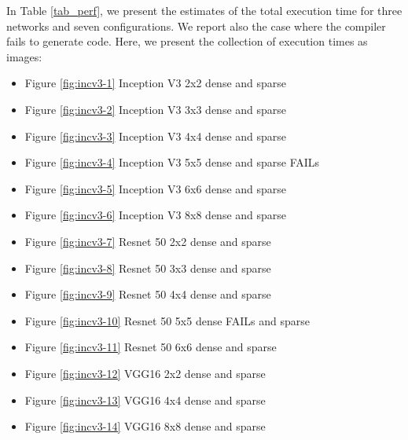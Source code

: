 \documentclass[conference]{IEEEtran}
\begin{document}
In Table \ref{tab_perf}, we present the estimates of the total
execution time for three networks and seven configurations. We report
also the case where the compiler fails to generate code.  Here, we
present the collection of execution times as images:
\begin{itemize}
  \item Figure \ref{fig:incv3-1} Inception V3 2x2 dense and sparse
  \item Figure \ref{fig:incv3-2} Inception V3 3x3 dense and sparse
  \item Figure \ref{fig:incv3-3} Inception V3 4x4 dense and sparse
  \item Figure \ref{fig:incv3-4} Inception V3 5x5 dense and sparse FAILs
  \item Figure \ref{fig:incv3-5} Inception V3 6x6 dense and sparse 
  \item Figure \ref{fig:incv3-6} Inception V3 8x8 dense and sparse
  \item Figure \ref{fig:incv3-7} Resnet 50 2x2 dense and sparse   
  \item Figure \ref{fig:incv3-8} Resnet 50 3x3 dense and sparse   
  \item Figure \ref{fig:incv3-9} Resnet 50 4x4 dense and sparse   
  \item Figure \ref{fig:incv3-10} Resnet 50 5x5 dense FAILs and sparse   
  \item Figure \ref{fig:incv3-11} Resnet 50 6x6 dense and sparse   
  \item Figure \ref{fig:incv3-12} VGG16  2x2 dense and sparse   
  \item Figure \ref{fig:incv3-13} VGG16  4x4 dense and sparse   
  \item Figure \ref{fig:incv3-14} VGG16  8x8 dense and sparse   
\end{itemize}
\newpage 
{}
\end{document}
